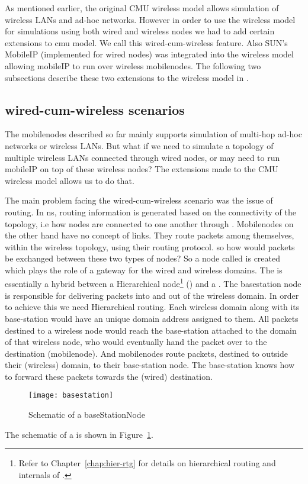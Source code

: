 {As mentioned earlier, the original CMU wireless model allows simulation of wireless LANs and ad-hoc networks. However in order to use the wireless model for simulations using both wired and wireless nodes we had to add certain extensions to cmu model. We call this wired-cum-wireless feature. Also SUN's MobileIP (implemented for wired nodes) was integrated into the wireless model allowing mobileIP to run over wireless mobilenodes. The following two subsections describe these two extensions to the wireless model in \ns. 


\subsection{wired-cum-wireless scenarios}
\label{sec:wired-cum-wireless}

The mobilenodes described so far mainly supports simulation of multi-hop ad-hoc networks or wireless LANs. But what if we need to simulate a topology of multiple wireless LANs connected through wired nodes, or may need to run mobileIP on top of these wireless nodes? The extensions made to the CMU wireless model allows us to do that.

The main problem facing the wired-cum-wireless scenario was the issue of routing. In ns, routing information is generated based on the connectivity of the topology, i.e how nodes are connected to one another through . Mobilenodes on the other hand have no concept of links. They route packets among themselves, within the wireless topology, using their routing protocol. so how would packets be exchanged between these two types of nodes?
So a node called  is created which plays the role of a gateway for the wired and wireless domains. The  is essentially a hybrid between a Hierarchical node\footnote{Refer to Chapter~\ref{chap:hier-rtg} for details on hierarchical routing and internals of .} () and a . The basestation node is responsible for delivering packets into and out of the wireless domain. In order to achieve this we need Hierarchical routing. Each wireless domain along with its base-station would have an unique domain address assigned to them. All packets destined to a wireless node would reach the base-station attached to the domain of that wireless node, who would eventually hand the packet over to the destination (mobilenode). And mobilenodes route packets, destined to outside their (wireless) domain, to their base-station node. The base-station knows how to forward these packets towards the (wired) destination. 
\begin{figure}
    \centerline{\texttt{[image: basestation]}}
    \caption{Schematic of a baseStationNode}
    \label{fig:mobilenode-basestation}
\end{figure}
The schematic of a  is shown in Figure~\ref{fig:mobilenode-basestation}.

}
